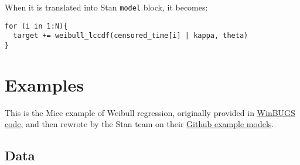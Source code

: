 \documentclass[]{article}
\begin{document}
When it is translated into Stan \texttt{model} block, it becomes:

\begin{verbatim}
for (i in 1:N){
  target += weibull_lccdf(censored_time[i] | kappa, theta)
}
\end{verbatim}

\section{Examples}\label{examples}

This is the Mice example of Weibull regression, originally provided in
\href{http://www.openbugs.net/Examples/Mice.html}{WinBUGS code}, and
then rewrote by the Stan team on their
\href{https://github.com/stan-dev/example-models/blob/master/bugs_examples/vol1/mice/mice.stan}{Github
example models}.

\subsection{Data}\label{data}
\end{document}
